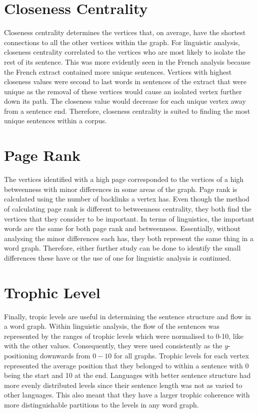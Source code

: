 \section{Closeness Centrality}
Closeness centrality determines the vertices that, on average, have the shortest connections to all the other vertices within the graph. For linguistic analysis, closeness centrality correlated to the vertices who are most likely to isolate the rest of its sentence. This was more evidently seen in the French analysis because the French extract contained more unique sentences. Vertices with highest closeness values were second to last words in sentences of the extract that were unique as the removal of these vertices would cause an isolated vertex further down its path. The closeness value would decrease for each unique vertex away from a sentence end. Therefore, closeness centrality is suited to finding the most unique sentences within a corpus.

\section{Page Rank}
The vertices identified with a high page corresponded to the vertices of a high betweenness with minor differences in some areas of the graph. Page rank is calculated using the number of backlinks a vertex has. Even though the method of calculating page rank is different to betweenness centrality, they both find the vertices that they consider to be important. In terms of linguistics, the important words are the same for both page rank and betweenness. Essentially, without analysing the minor differences each has, they both represent the same thing in a word graph. Therefore, either further study can be done to identify the small differences these have or the use of one for linguistic analysis is continued.

\section{Trophic Level}
Finally, tropic levels are useful in determining the sentence structure and flow in a word graph. Within linguistic analysis, the flow of the sentences was represented by the ranges of trophic levels which were normalised to 0-10, like with the other values. Consequently, they were used consistently as the $y$-positioning downwards from $0-10$ for all graphs. Trophic levels for each vertex represented the average position that they belonged to within a sentence with 0 being the start and 10 at the end. Languages with better sentence structure had more evenly distributed levels since their sentence length was not as varied to other languages. This also meant that they have a larger trophic coherence with more distinguishable partitions to the levels in any word graph.

